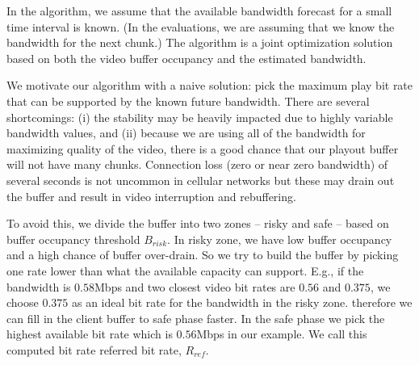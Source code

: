 In the algorithm, we assume that the available bandwidth forecast for
a small time interval is known.
(In the evaluations, we are assuming that we know the bandwidth for
the next chunk.)
The algorithm is a joint optimization
solution based on both the video buffer occupancy and the estimated
 bandwidth. 

We motivate our algorithm with a naive solution: pick the maximum
 play bit rate that can be supported by the known future bandwidth. 
There are several shortcomings: (i) the stability may be heavily
impacted due to highly variable bandwidth values, and (ii)
because we are using all of the bandwidth for maximizing quality of
the video, there is a good chance that our playout buffer will not
have many chunks. 
Connection loss (zero or near zero bandwidth) of several seconds is
not uncommon in  cellular networks but these may drain out the buffer
and result in video interruption and rebuffering.

To avoid this, we divide the
buffer into two zones -- risky and safe -- based on buffer occupancy
threshold $B_{risk} $. In risky zone, we have low buffer occupancy and
a high chance of buffer over-drain. So we try to build the buffer by
picking one rate lower than what the available capacity can support.
E.g., if the bandwidth is $0.58$Mbps and two closest video
bit rates are $0.56$ and $0.375$, we choose $ 0.375$ as an
ideal bit rate for the bandwidth in the risky zone. 
 therefore we can
fill in the client buffer to safe phase faster. 
In the safe phase
 we
pick the highest available bit rate which is $0.56$Mbps in our
example. We call this computed bit rate referred bit rate, $R_{ref}$.

